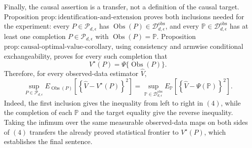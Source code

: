 Finally, the causal assertion is a transfer, not a definition of the causal target.  Proposition \(\mathrm{prop:identification\mbox{-}and\mbox{-}extension}\) proves both inclusions needed for the experiment: every \(P\in\mathcal P_{d,\epsilon}\) has \(\operatorname{Obs}(P)\in\mathcal D_{d,\epsilon}^{\mathrm{obs}}\), and every \(\mathbb P\in\mathcal D_{d,\epsilon}^{\mathrm{obs}}\) has at least one completion \(P\in\mathcal P_{d,\epsilon}\) with \(\operatorname{Obs}(P)=\mathbb P\).  Proposition \(\mathrm{prop:causal\mbox{-}optimal\mbox{-}value\mbox{-}corollary}\), using consistency and armwise conditional exchangeability, proves for every such completion that
\[
 V^\star(P)=\Psi\{\operatorname{Obs}(P)\}.
\]
Therefore, for every observed-data estimator \(\widehat V\),
\[
 \sup_{P\in\mathcal P_{d,\epsilon}}
 E_{\operatorname{Obs}(P)}\!\left[
 \left\{\widehat V-V^\star(P)\right\}^{2}
 \right]
 =
 \sup_{\mathbb P\in\mathcal D_{d,\epsilon}^{\mathrm{obs}}}
 E_{\mathbb P}\!\left[
 \left\{\widehat V-\Psi(\mathbb P)\right\}^{2}
 \right].                                                                             \tag{4}
\]
Indeed, the first inclusion gives the inequality from left to right in \((4)\), while the completion of each \(\mathbb P\) and the target equality give the reverse inequality.  Taking the infimum over the same measurable observed-data maps on both sides of \((4)\) transfers the already proved statistical frontier to \(V^\star(P)\), which establishes the final sentence.